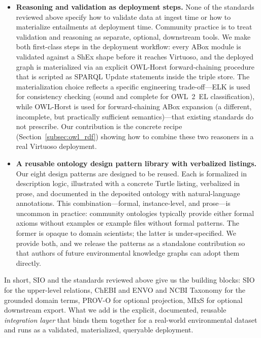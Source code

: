 \documentclass[11pt,a4paper]{article}
\begin{document}
\begin{itemize}
  \item \textbf{Reasoning and validation as deployment steps.}
    None of the standards reviewed above specify how to validate
    data at ingest time or how to materialize entailments at
    deployment time. Community practice is to treat validation and
    reasoning as separate, optional, downstream tools. We make both
    first-class steps in the deployment workflow: every ABox module
    is validated against a ShEx shape before it reaches Virtuoso,
    and the deployed graph is materialized via an explicit OWL-Horst
    forward-chaining procedure that is scripted as SPARQL Update
    statements inside the triple store. The materialization choice
    reflects a specific engineering trade-off---ELK is used for
    consistency checking (sound and complete for OWL~2~EL
    classification), while OWL-Horst is used for forward-chaining
    ABox expansion (a different, incomplete, but practically
    sufficient semantics)---that existing standards do not prescribe.
    Our contribution is the concrete recipe (Section~\ref{subsec:owl_rdf})
    showing how to combine these two reasoners in a real Virtuoso
    deployment.

  \item \textbf{A reusable ontology design pattern library with
    verbalized listings.} Our eight design patterns are designed to
    be reused. Each is formalized in description logic, illustrated
    with a concrete Turtle listing, verbalized in prose, and
    documented in the deposited ontology with natural-language
    annotations. This combination---formal, instance-level, and
    prose---is uncommon in practice: community ontologies typically
    provide either formal axioms without examples or example files
    without formal patterns. The former is opaque to domain
    scientists; the latter is under-specified. We provide both, and
    we release the patterns as a standalone contribution so that
    authors of future environmental knowledge graphs can adopt them
    directly.

\end{itemize}

In short, SIO and the standards reviewed above give us the building
blocks: SIO for the upper-level relations, ChEBI and ENVO and NCBI
Taxonomy for the grounded domain terms, PROV-O for optional
projection, MIxS for optional downstream export. What we add is the
explicit, documented, reusable \emph{integration layer} that binds
them together for a real-world environmental dataset and runs as a
validated, materialized, queryable deployment.
\end{document}
